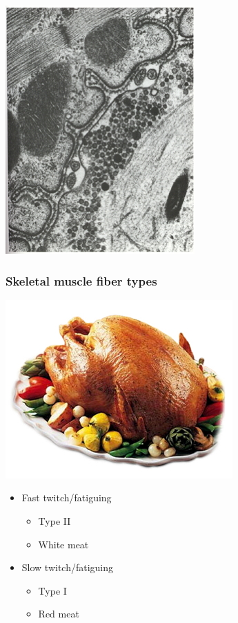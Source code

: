 \documentclass[
  letterpaper,
  DIV=11,
  numbers=noendperiod]{scrartcl}
\providecommand{\tightlist}{%
  \setlength{\itemsep}{0pt}\setlength{\parskip}{0pt}}\usepackage{longtable,booktabs,array}
\begin{document}
\begin{center}
\includegraphics{../include/img/motor-endplate-nt-release.jpg}
\end{center}

\subsubsection{Skeletal muscle fiber
types}\label{skeletal-muscle-fiber-types}

\begin{center}
\includegraphics{../include/img/turkey.jpg}
\end{center}

\begin{itemize}
\tightlist
\item
  Fast twitch/fatiguing

  \begin{itemize}
  \tightlist
  \item
    Type II
  \item
    White meat
  \end{itemize}
\item
  Slow twitch/fatiguing

  \begin{itemize}
  \tightlist
  \item
    Type I
  \item
    Red meat
  \end{itemize}
\end{itemize}
\end{document}
